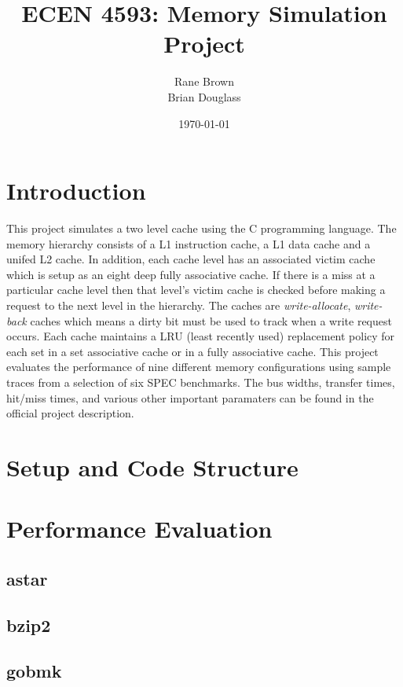 \documentclass[11pt,titlepage]{article}
\author{Rane Brown \\ Brian Douglass}
\title{ECEN 4593: Memory Simulation Project}
\date{\today}
\begin{document}
\maketitle
\tableofcontents
\listoffigures
\listoftables
\newpage

\section{Introduction}
    This project simulates a two level cache using the C programming language. The memory hierarchy consists of a L1 instruction cache, a L1 data cache and a unifed L2 cache. In addition, each cache level has an associated victim cache which is setup as an eight deep fully associative cache. If there is a miss at a particular cache level then that level's victim cache is checked before making a request to the next level in the hierarchy. The caches are \emph{write-allocate}, \emph{write-back} caches which means a dirty bit must be used to track when a write request occurs. Each cache maintains a LRU (least recently used) replacement policy for each set in a set associative cache or in a fully associative cache. This project evaluates the performance of nine different memory configurations using sample traces from a selection of six SPEC benchmarks. The bus widths, transfer times, hit/miss times, and various other important paramaters can be found in the official project description. 

\section{Setup and Code Structure}

\section{Performance Evaluation}

    \subsection{astar}

    \subsection{bzip2}

    \subsection{gobmk}
\end{document}
